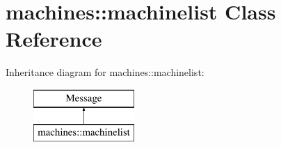 \hypertarget{classmachines_1_1machinelist}{}\section{machines\+:\+:machinelist Class Reference}
\label{classmachines_1_1machinelist}
Inheritance diagram for machines\+:\+:machinelist\+:\begin{figure}[H]
\begin{center}
\leavevmode
\includegraphics[height=2.000000cm]{classmachines_1_1machinelist}
\end{center}
\end{figure}
